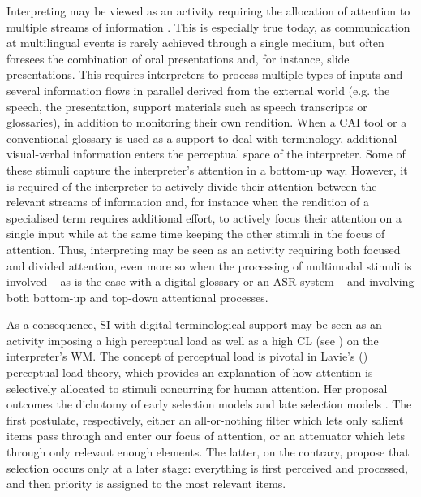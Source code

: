 Interpreting may be viewed as an activity requiring the allocation of attention to multiple streams of information \citep{seeber_multimodal_2017}. This is especially true today, as communication at multilingual events is rarely achieved through a single medium, but often foresees the combination of oral presentations and, for instance, slide presentations. This requires interpreters to process multiple types of inputs and several information flows in parallel derived from the external world (e.g. the speech, the presentation, support materials such as speech transcripts or glossaries), in addition to monitoring their own rendition. When a CAI tool or a conventional glossary is used as a support to deal with terminology, additional visual-verbal information enters the perceptual space of the interpreter. Some of these stimuli capture the interpreter's attention in a bottom-up way. However, it is required of the interpreter to actively divide their attention between the relevant streams of information and, for instance when the rendition of a specialised term requires additional effort, to actively focus their attention on a single input while at the same time keeping the other stimuli in the focus of attention. Thus, interpreting may be seen as an activity requiring both focused and divided attention, even more so when the processing of multimodal stimuli is involved – as is the case with a digital glossary or an ASR system – and involving both bottom-up and top-down attentional processes.


As a consequence, SI with digital terminological support may be seen as an activity imposing a high perceptual load as well as a high CL (see ) on the interpreter's WM. The concept of perceptual load is pivotal in Lavie's (\citeyear{lavie_perceptual_1995,lavie_selective_2000,lavie_distracted_2005,lavie_attention_2010}) perceptual load theory, which provides an explanation of how attention is selectively allocated to stimuli concurring for human attention. Her proposal outcomes the dichotomy of early selection models \citep{broadbent_perception_1958,treisman_selective_1964} and late selection models \citep{deutsch_attention_1963,norman_toward_1968}. The first postulate, respectively, either an all-or-nothing filter which lets only salient items pass through and enter our focus of attention, or an attenuator which lets through only relevant enough elements. The latter, on the contrary, propose that selection occurs only at a later stage: everything is first perceived and processed, and then priority is assigned to the most relevant items.

